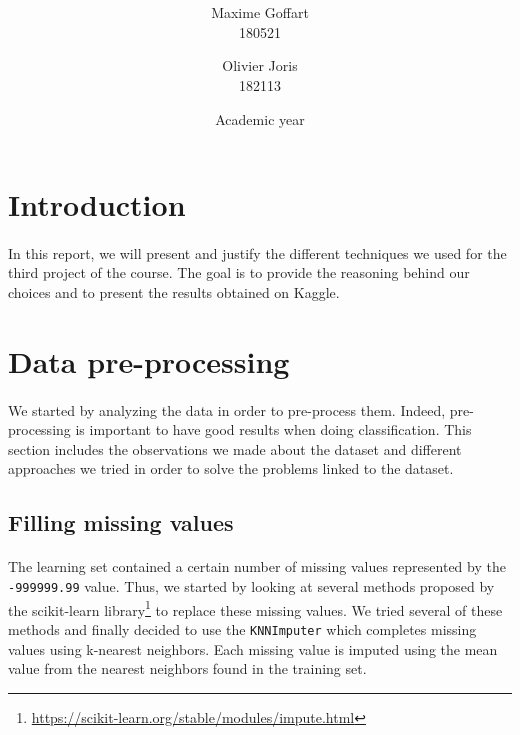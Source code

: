 \documentclass[a4paper, 11pt, oneside]{article}
\title{\ClassName\\\vspace*{0.8cm}\ProjectName\vspace{1cm}}
\author{Maxime Goffart \\180521 \and Olivier Joris\\182113}
\date{\vspace{1cm}Academic year \AcademicYear}
\begin{document}
\begin{titlingpage}
{\let\newpage\relax\maketitle}
\end{titlingpage}

\thispagestyle{empty}
\newpage


\tableofcontents
\newpage


\section{Introduction}
\paragraph{}In this report, we will present and justify the different techniques we used for the third project of the course. The goal is to provide the reasoning behind our choices and to present the results obtained on Kaggle.


\section{Data pre-processing}\label{sec:data-pre-process}
\paragraph{}We started by analyzing the data in order to pre-process them. Indeed, pre-processing is important
to have good results when doing classification. This section includes the observations we made about the dataset
and different approaches we tried in order to solve the problems linked to the dataset.

\subsection{Filling missing values}
\paragraph{}The learning set contained a certain number of missing values represented by the \texttt{-999999.99} value. Thus, we started by looking at several 
methods proposed by the scikit-learn library\footnote{\url{https://scikit-learn.org/stable/modules/impute.html}} to replace these missing values. We tried several of these methods and finally decided to use the \texttt{KNNImputer} which completes missing values using k-nearest neighbors. Each missing value is imputed using the mean value from the nearest neighbors found in the training set. 
\end{document}
